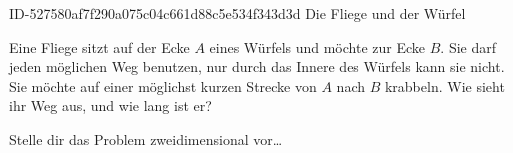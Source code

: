 \begin{exercise}
      {ID-527580af7f290a075c04c661d88c5e534f343d3d}
      {Die Fliege und der Würfel}
  \ifproblem\problem\par
    Eine Fliege sitzt auf der Ecke $A$ eines Würfels und möchte zur Ecke $B$.
    Sie darf jeden möglichen Weg benutzen, nur durch das Innere des Würfels
    kann sie nicht. Sie möchte auf einer möglichst kurzen Strecke von $A$
    nach $B$ krabbeln. Wie sieht ihr Weg aus, und wie lang ist er?
    \begin{center}
    \end{center}
  \fi
  \ifoutline\outline\par
    Stelle dir das Problem zweidimensional vor\ldots
  \fi
\end{exercise}
